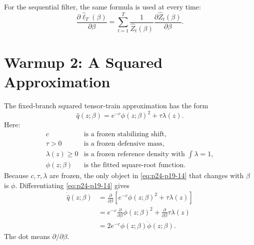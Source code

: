 \documentclass[11pt]{article}
\numberwithin{equation}{section}
\newcommand{\widehatell}{\widehat\ell}
\begin{document}
For the sequential filter, the same formula is used at every time:
\begin{equation}
    \frac{\partial\widehatell_T(\beta)}{\partial\beta}
    =
    \sum_{t=1}^{T}
    \frac{1}{\widehat Z_t(\beta)}
    \frac{\partial\widehat Z_t(\beta)}{\partial\beta}.
    \label{eq:p24-p19-13}
\end{equation}

\section{Warmup 2: A Squared Approximation}

The fixed-branch squared tensor-train approximation has the form
\begin{equation}
    \widehat q(z;\beta)
    =
    e^{-c}\phi(z;\beta)^2+\tau\lambda(z).
    \label{eq:p24-p19-14}
\end{equation}
Here:
\begin{equation}
\begin{array}{ll}
c & \text{is a frozen stabilizing shift},\\
\tau>0 & \text{is a frozen defensive mass},\\
\lambda(z)\ge0 & \text{is a frozen reference density with }\int\lambda=1,\\
\phi(z;\beta) & \text{is the fitted square-root function.}
\end{array}
\label{eq:p24-p19-15}
\end{equation}
Because \(c,\tau,\lambda\) are frozen, the only object in \eqref{eq:p24-p19-14} that changes
with \(\beta\) is \(\phi\).  Differentiating \eqref{eq:p24-p19-14} gives
\begin{equation}
\begin{aligned}
    \dot{\widehat q}(z;\beta)
    &=
    \frac{\partial}{\partial\beta}
    \left[
    e^{-c}\phi(z;\beta)^2+\tau\lambda(z)
    \right]\\
    &=
    e^{-c}
    \frac{\partial}{\partial\beta}\phi(z;\beta)^2
    +
    \frac{\partial}{\partial\beta}\tau\lambda(z)\\
    &=
    2e^{-c}\phi(z;\beta)\dot\phi(z;\beta).
\end{aligned}
\label{eq:p24-p19-16}
\end{equation}
The dot means \(\partial/\partial\beta\).
\end{document}
